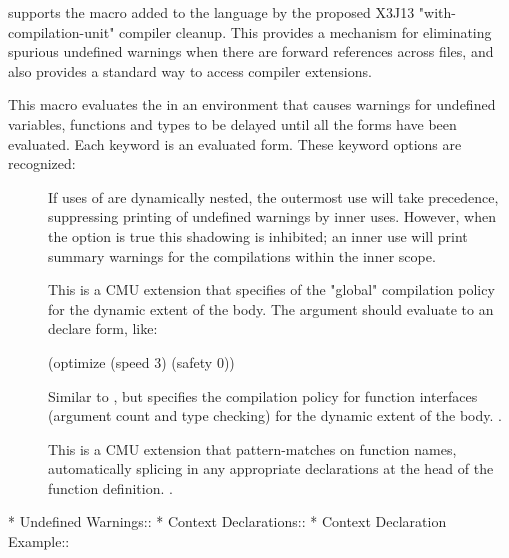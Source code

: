\cmucl{} supports the  macro added to the language by
the proposed X3J13 "with-compilation-unit" compiler cleanup.  This provides a
mechanism for eliminating spurious undefined warnings when there are forward
references across files, and also provides a standard way to access compiler
extensions.


This macro evaluates the  in an environment that causes warnings for
undefined variables, functions and types to be delayed until all the forms have
been evaluated.  Each keyword  is an evaluated form.  These keyword
options are recognized:
\begin{description}

\item[]
If uses of  are dynamically nested, the outermost
use will take precedence, suppressing printing of undefined warnings by inner
uses.  However, when the  option is true this shadowing is
inhibited; an inner use will print summary warnings for the compilations within
the inner scope.

\item[]
This is a CMU extension that specifies of the "global" compilation policy for
the dynamic extent of the body.  The argument should evaluate to an
 declare form, like:
\begin{lisp}
(optimize (speed 3) (safety 0))
\end{lisp}

\item[]
Similar to , but specifies the compilation policy for function
interfaces (argument count and type checking) for the dynamic extent of the
body.  .

\item[]
This is a CMU extension that pattern-matches on function names, automatically
splicing in any appropriate declarations at the head of the function
definition.  .
\end{description}
\enddefmac

\begin{menu}
* Undefined Warnings::          
* Context Declarations::        
* Context Declaration Example::  
\end{menu}

